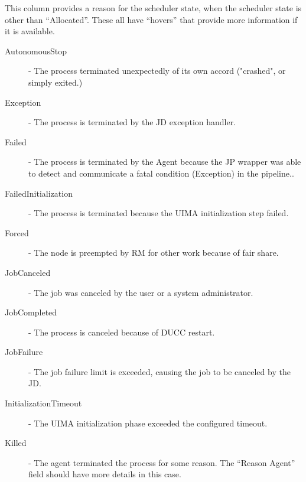\begin{description}
          This column provides a reason for the scheduler state, when the scheduler state is other than ``Allocated''. 
          These all have ``hovers'' that provide more information
          if it is available.

            \begin{description}          
                \item[AutonomousStop] - The process terminated unexpectedly of its own accord ("crashed", or
                  simply exited.) 

                \item[Exception] - The process is terminated by the JD exception handler. 

                \item[Failed] - The process is terminated by the Agent because the JP wrapper was able to detect and 
                  communicate a fatal condition (Exception) in the pipeline.. 
                  
                \item[FailedInitialization] - The process is terminated because the UIMA initialization step failed. 
                  
                \item[Forced] - The node is preempted by RM for other work because of fair share. 
                  
                \item[JobCanceled] - The job was canceled by the user or a system administrator. 
                  
                \item[JobCompleted] - The process is canceled because of DUCC restart. 
                  
                \item[JobFailure] - The job failure limit is exceeded, causing the job to be canceled by the JD.                    
                  
                \item[InitializationTimeout] - The UIMA initialization phase exceeded the configured timeout. 
                  
                \item[Killed] - The agent terminated the process for some reason. The ``Reason Agent'' field
                  should have more details in this case.
          

\end{description}
\end{description}
